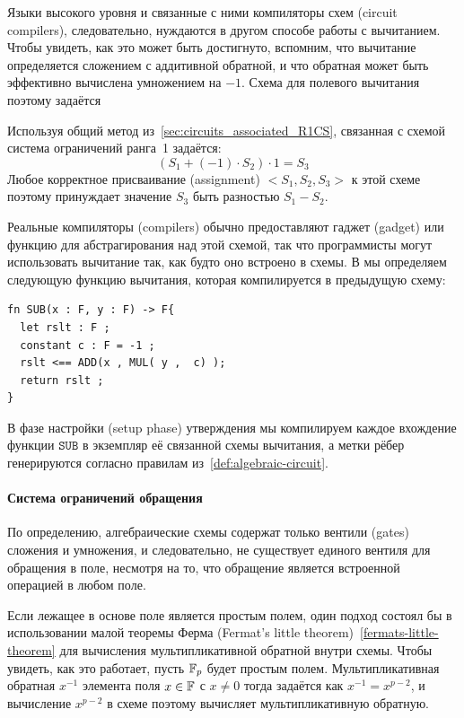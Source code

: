 Языки высокого уровня и связанные с ними компиляторы схем (circuit compilers), следовательно, нуждаются в другом способе работы с вычитанием. Чтобы увидеть, как это может быть достигнуто, вспомним, что вычитание определяется сложением с аддитивной обратной, и что обратная может быть эффективно вычислена умножением на $-1$. Схема для полевого вычитания поэтому задаётся
\begin{center}
\end{center}
Используя общий метод из~\ref{sec:circuits_associated_R1CS}, связанная с схемой система ограничений ранга~1 задаётся:
\begin{equation}
\left(S_1 + (-1)\cdot S_2\right)\cdot 1 = S_3
\end{equation}
Любое корректное присваивание (assignment) $<S_1,S_2, S_3>$ к этой схеме поэтому принуждает значение $S_3$ быть разностью $S_1- S_2$.

Реальные компиляторы (compilers) обычно предоставляют гаджет (gadget) или функцию для абстрагирования над этой схемой, так что программисты могут использовать вычитание так, как будто оно встроено в схемы.
В  мы определяем следующую функцию вычитания, которая компилируется в предыдущую схему:
\begin{lstlisting}
fn SUB(x : F, y : F) -> F{
  let rslt : F ;
  constant c : F = -1 ;
  rslt <== ADD(x , MUL( y ,  c) );
  return rslt ;
}
\end{lstlisting}
В фазе настройки (setup phase) утверждения мы компилируем каждое вхождение функции $\mathtt{SUB}$ в экземпляр её связанной схемы вычитания, а метки рёбер генерируются согласно правилам из~\ref{def:algebraic-circuit}.
\paragraph{Система ограничений обращения} По определению, алгебраические схемы содержат только вентили (gates) сложения и умножения, и следовательно, не существует единого вентиля для обращения в поле, несмотря на то, что обращение является встроенной операцией в любом поле.

Если лежащее в основе поле является простым полем, один подход состоял бы в использовании малой теоремы Ферма (Fermat's little theorem)~\ref{fermats-little-theorem} для вычисления мультипликативной обратной внутри схемы. Чтобы увидеть, как это работает, пусть $\mathbb{F}_p$ будет простым полем. Мультипликативная обратная $x^{-1}$ элемента поля $x\in\mathbb{F}$ с $x\neq 0$ тогда задаётся как $x^{-1}= x^{p-2}$, и вычисление $x^{p-2}$ в схеме поэтому вычисляет мультипликативную обратную.

